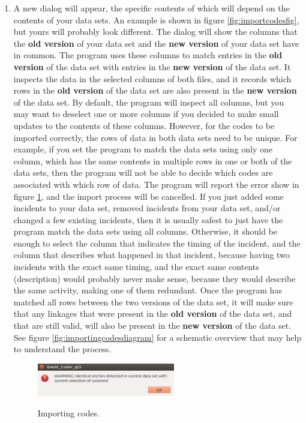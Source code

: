 \documentclass{memoir}
\begin{document}
\begin{enumerate}
\item{A new dialog will appear, the specific contents of which will depend on the contents of your data sets. An example is shown in figure \ref{fig:importcodesfig}, but yours will probably look different. The dialog will show the columns that the \textbf{old version} of your data set and the \textbf{new version} of your data set have in common. The program uses these columns to match entries in the \textbf{old version} of the data set with entries in the \textbf{new version} of the data set. It inspects the data in the selected columns of both files, and it records which rows in the \textbf{old version} of the data set are also present in the \textbf{new version} of the data set. By default, the program will inspect all columns, but you may want to deselect one or more columns if you decided to make small updates to the contents of these columns. However, for the codes to be imported correctly, the rows of data in both data sets need to be unique. For example, if you set the program to match the data sets using only one column, which has the same contents in multiple rows in one or both of the data sets, then the program will not be able to decide which codes are associated with which row of data. The program will report the error show in figure \ref{fig:importingcodeserror}, and the import process will be cancelled. If you just added some incidents to your data set, removed incidents from your data set, and/or changed a few existing incidents, then it is usually safest to just have the program match the data sets using all columns. Otherwise, it should be enough to select the column that indicates the timing of the incident, and the column that describes what happened in that incident, because having two incidents with the exact same timing, and the exact same contents (description) would probably never make sense, because they would describe the same activity, making one of them redundant. Once the program has matched all rows between the two versions of the data set, it will make sure that any linkages that were present in the \textbf{old version} of the data set, and that are still valid, will also be present in the \textbf{new version} of the data set. See figure \ref{fig:importingcodesdiagram} for a schematic overview that may help to understand the process.}
  \begin{figure}[h!]
    \centering
    \caption{Importing codes.}
    \includegraphics[width=60mm]{Screenshot_26.pdf}
    \label{fig:importingcodeserror}
  \end{figure}


\end{enumerate}
\end{document}
